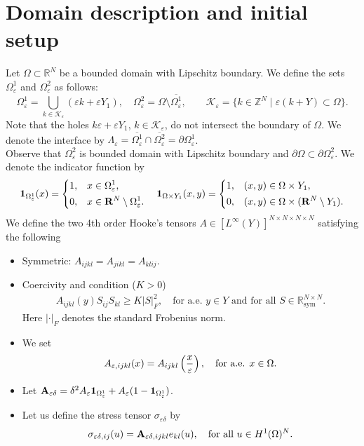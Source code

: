 \documentclass[11pt,a4paper]{article}
\numberwithin{equation}{section}
\def\1{{\bf 1}}
\def\wo{\overline}
\def\O{\Omega}
\def\d{\delta}
\def\e{\varepsilon}
\def\sy{\text{sym}}
\def\R{{\mathbb{R}}}
\def\Z{{\mathbb{Z}}}
\def\R{{\mathbb{R}}}
\def\Z{{\mathbb{Z}}}
\def\Kc{{\mathcal{K}}}
\def\ed{{\varepsilon\delta}}
\def\X{\times }
\def\GA{{\bf A}}
\def\GR{{\bf R}}
\begin{document}
\section{Domain description and initial setup}\label{S02}
Let $\O\subset\R^N$ be a bounded domain with Lipschitz boundary.
We define the sets $\O_\e^1$ and $\O^2_\e$ as follows:
$$\O_{\e}^1=\bigcup_{k\in \Kc_\e} (\e k+ \e Y_1),\quad \O_\e^2=\O\setminus \overline{\O^1_\e},\qquad  \Kc_\e =\big\{k\in \Z^N\; |\; \e(k+ Y)\subset \O\big\}.$$  Note that the holes $k\e+\e Y_1$, $k\in \Kc_\e$, do not intersect the boundary of $\O$.
We denote the interface by $\Lambda_\e=\wo{\O^1_\e}\cap \wo{\O^2_\e} =\partial \O^1_\e $.\\
Observe that $\O^2_\e$ is bounded domain with Lipschitz boundary and $\partial \O\subset \partial \O^2_\e$. We denote the indicator function by
$$\1_{\O^1_\e}(x)=\left\{\begin{aligned}
1,\quad &x\in \O^1_\e,\\
0,\quad &x\in\GR^N\setminus \O^1_\e.
\end{aligned}\right.\quad 
 \1_{\O\X Y_1}(x,y) =\left\{\begin{aligned}
1,\quad &(x,y)\in \O\X Y_1,\\
0,\quad &(x,y)\in\O\X(\GR^N\setminus Y_1).
\end{aligned}\right.$$
We define the two 4th order Hooke's tensors $A\in [L^\infty(Y)]^{N\X N\X N\X N}$ satisfying the following
\begin{itemize}
	\item Symmetric: $A_{ijkl}= A_{jikl}= A_{klij}$.
	\item Coercivity and  condition ($K>0$)
	\begin{equation}\label{Coe01}
		\begin{aligned}
			A_{ijkl}(y) S_{ij} S_{kl}\geq K| S|^2_F,\quad \text{for a.e. $y\in Y$ and for all $S\in \R^{N\X N}_\sy$}.
		\end{aligned}	
	\end{equation}
	Here $|\cdot|_F$ denotes the standard Frobenius norm. 
	\item We set
	$$A_{\e,ijkl}(x)= A_{ijkl}\left({x\over \e}\right),\quad  \text{for a.e. $x\in\O$}.$$
	\item Let $\GA_\ed=\d^2 A_\e \1_{\O^1_\e}+ A_\e(1-\1_{\O^1_\e})$.
	\item Let us define the stress tensor $\sigma_\ed$ by
	$$\sigma_{\ed,ij}(u)=\GA_{\ed,ijkl}e_{kl}(u),\quad \text{for all $u\in H^1(\O)^N$}.$$
\end{itemize}
\end{document}
